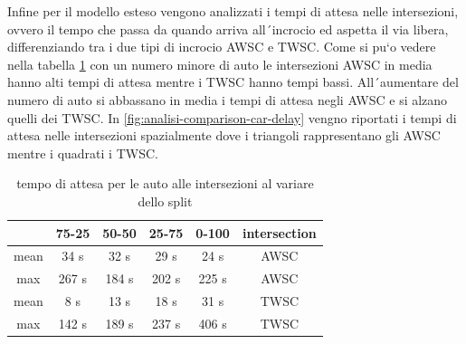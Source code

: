 Infine per il modello esteso vengono analizzati i tempi di attesa nelle intersezioni,
ovvero il tempo che passa da quando arriva all´incrocio ed aspetta
il via libera, differenziando tra i due tipi di incrocio AWSC e TWSC.
Come si pu`o vedere nella tabella \ref*{tab:analisi-car-delay} con un numero minore di auto le intersezioni AWSC 
in media hanno alti tempi di attesa mentre i TWSC hanno tempi bassi.
All´aumentare del numero di auto si abbassano in media i tempi di attesa negli AWSC e si alzano quelli dei TWSC.
In \ref*{fig:analisi-comparison-car-delay} vengno riportati i tempi di attesa nelle intersezioni spazialmente
dove i triangoli rappresentano gli AWSC mentre i quadrati i TWSC.

\begin{table}[ht]
    \centering
    \begin{tabular}{|c|c|c|c|c|c|}
    \hline
         & 75-25 & 50-50 & 25-75 & 0-100 & intersection \\ \hline
    mean & 34 s  & 32 s  & 29 s  & 24 s  & AWSC         \\ \hline
    max  & 267 s & 184 s & 202 s & 225 s & AWSC         \\ \hline
    mean & 8 s   & 13 s  & 18 s  & 31 s  & TWSC         \\ \hline
    max  & 142 s & 189 s & 237 s & 406 s & TWSC         \\ \hline
    \end{tabular}
    \caption{tempo di attesa per le auto alle intersezioni al variare dello split}
    \label{tab:analisi-car-delay}
\end{table}


